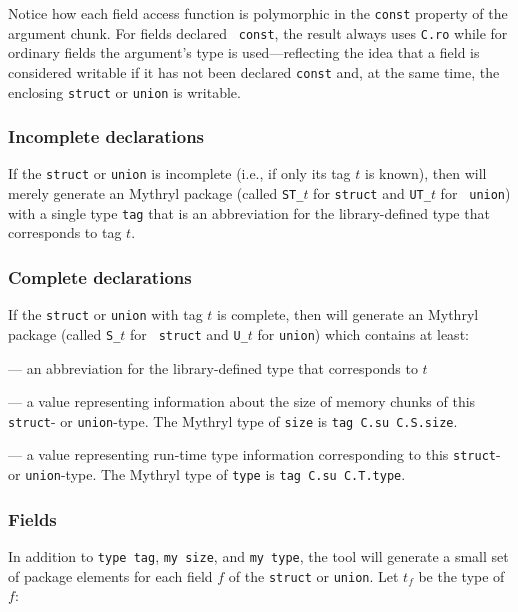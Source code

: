 \noindent Notice how each field access function is polymorphic in the
{\tt const} property of the argument chunk.  For fields declared {\tt
  const}, the result always uses {\tt C.ro} while for ordinary fields
the argument's type is used---reflecting the idea that a field is
considered writable if it has not been declared {\tt const} and, at
the same time, the enclosing {\tt struct} or {\tt union} is writable.

\subsubsection*{Incomplete declarations}

If the {\tt struct} or {\tt union} is incomplete (i.e., if only its
tag $t$ is known), then {\cgluemaker} will merely generate an Mythryl package
(called {\tt ST\_$t$} for {\tt struct} and {\tt UT\_$t$} for {\tt
  union}) with a single type {\tt tag} that is an abbreviation for the
library-defined type that corresponds to tag $t$.

\subsubsection*{Complete declarations}

If the {\tt struct} or {\tt union} with tag $t$ is complete, then
{\cgluemaker} will generate an Mythryl package (called {\tt S\_$t$} for {\tt
  struct} and {\tt U\_$t$} for {\tt union}) which contains at least:
\begin{description}\setlength{\itemsep}{0pt}
\item[{\tt type tag}] --- an abbreviation for the library-defined type
  that corresponds to $t$
\item[{\tt my size}] --- a value representing information about the
  size of memory chunks of this {\tt struct}- or {\tt union}-type.
  The Mythryl type of {\tt size} is {\tt tag C.su C.S.size}.
\item[{\tt my type}] --- a value representing run-time type
  information corresponding to this {\tt struct}- or {\tt union}-type.
  The Mythryl type of {\tt type} is {\tt tag C.su C.T.type}.
\end{description}

\subsubsection*{Fields}

In addition to {\tt type tag}, {\tt my size}, and {\tt my type}, the
{\cgluemaker} tool will generate a small set of package elements for
each field $f$ of the {\tt struct} or {\tt union}.  Let $t_f$ be the
type of $f$:

